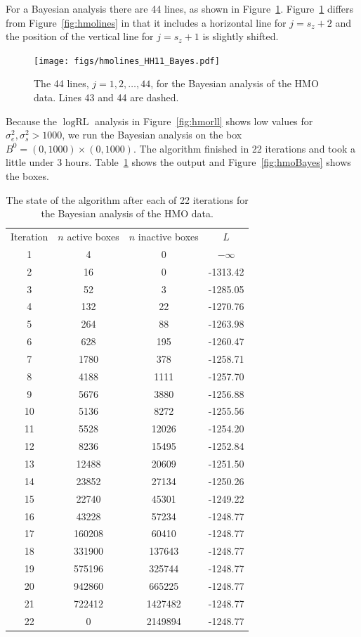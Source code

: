 \documentclass[ejs]{imsart}
\newcommand{\RLorig}{\text{RL}}
\newcommand{\logRLorig}{\log\RLorig}
\newcommand{\sigssq}{\sigma_s^2}
\newcommand{\sigesq}{\sigma_e^2}
\begin{document}
For a Bayesian analysis there are 44 lines, as shown in Figure~\ref{fig:hmoBayeslines}.  Figure~\ref{fig:hmoBayeslines} differs from Figure~\ref{fig:hmolines} in that it includes a horizontal line for $j = s_z+2$ and the position of the vertical line for $j = s_z+1$ is slightly shifted.
\begin{figure}
	\centering
	\texttt{[image: figs/hmolines\_HH11\_Bayes.pdf]}
	\caption{The 44 lines, $j=1, 2, \dots, 44$, for the Bayesian analysis of the HMO data.
	              Lines 43 and 44 are dashed.}
	\label{fig:hmoBayeslines}
\end{figure}
Because the $\logRLorig$ analysis in Figure~\ref{fig:hmorll} shows low values for $\sigesq, \sigssq > 1000$, we run the Bayesian analysis on the box $B^0 = (0,1000) \times (0,1000)$.
The algorithm finished in 22 iterations and took a little under 3 hours.  Table~\ref{table:hmo_HH11Bayes} shows the output and Figure~\ref{fig:hmoBayes} shows the boxes.
\begin{table}[H]
\centering
\begin{tabular}{|c|c|c|c|}
\hline
Iteration & $n$ active boxes & $n$ inactive boxes & $L$\\
1 & 4 & 0 & $-\infty$\\
2 & 16 & 0 & -1313.42\\
3 & 52 & 3 & -1285.05\\
4 & 132 & 22 & -1270.76\\
5 & 264 & 88 & -1263.98\\
6 & 628 & 195 & -1260.47\\
7 & 1780 & 378 & -1258.71\\
8 & 4188 & 1111 & -1257.70\\
9 & 5676 & 3880 & -1256.88\\
10 & 5136 & 8272 & -1255.56\\
11 & 5528 & 12026 & -1254.20\\
12 & 8236 & 15495 & -1252.84\\
13 & 12488 & 20609 & -1251.50\\
14 & 23852 & 27134 & -1250.26\\
15 & 22740 & 45301 & -1249.22\\
16 & 43228 & 57234 & -1248.77\\
17 & 160208 & 60410 & -1248.77\\
18 & 331900 & 137643 & -1248.77\\
19 & 575196 & 325744 & -1248.77\\
20 & 942860 & 665225 & -1248.77\\
21 & 722412 & 1427482 & -1248.77\\
22 & 0 & 2149894 & -1248.77\\
\hline
\end{tabular}
\caption{The state of the algorithm after each of 22 iterations for the Bayesian analysis of the HMO data.}
\label{table:hmo_HH11Bayes}
\end{table}
\end{document}

